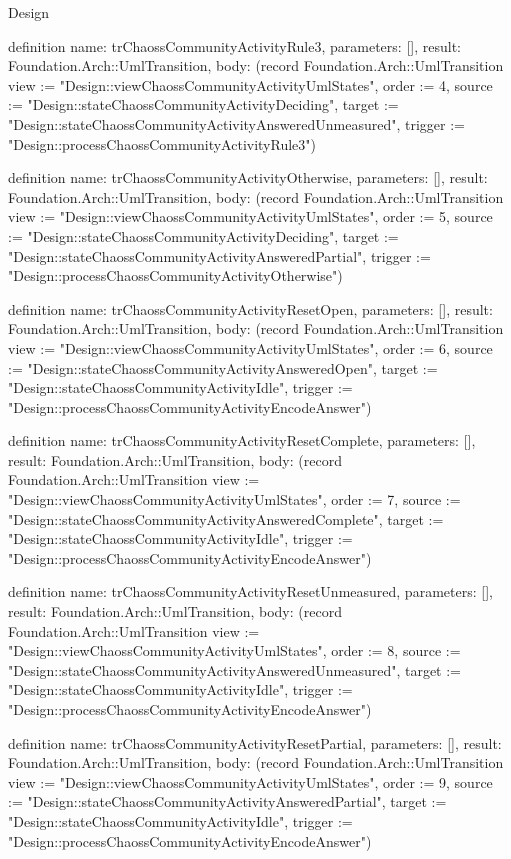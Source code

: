 \begin{lexlean}{Design}
\begin{semanticmodule}
definition{
  name: trChaossCommunityActivityRule3,
  parameters: [],
  result: Foundation.Arch::UmlTransition,
  body: (record Foundation.Arch::UmlTransition {view := "Design::viewChaossCommunityActivityUmlStates", order := 4, source := "Design::stateChaossCommunityActivityDeciding", target := "Design::stateChaossCommunityActivityAnsweredUnmeasured", trigger := "Design::processChaossCommunityActivityRule3"})
}

definition{
  name: trChaossCommunityActivityOtherwise,
  parameters: [],
  result: Foundation.Arch::UmlTransition,
  body: (record Foundation.Arch::UmlTransition {view := "Design::viewChaossCommunityActivityUmlStates", order := 5, source := "Design::stateChaossCommunityActivityDeciding", target := "Design::stateChaossCommunityActivityAnsweredPartial", trigger := "Design::processChaossCommunityActivityOtherwise"})
}

definition{
  name: trChaossCommunityActivityResetOpen,
  parameters: [],
  result: Foundation.Arch::UmlTransition,
  body: (record Foundation.Arch::UmlTransition {view := "Design::viewChaossCommunityActivityUmlStates", order := 6, source := "Design::stateChaossCommunityActivityAnsweredOpen", target := "Design::stateChaossCommunityActivityIdle", trigger := "Design::processChaossCommunityActivityEncodeAnswer"})
}

definition{
  name: trChaossCommunityActivityResetComplete,
  parameters: [],
  result: Foundation.Arch::UmlTransition,
  body: (record Foundation.Arch::UmlTransition {view := "Design::viewChaossCommunityActivityUmlStates", order := 7, source := "Design::stateChaossCommunityActivityAnsweredComplete", target := "Design::stateChaossCommunityActivityIdle", trigger := "Design::processChaossCommunityActivityEncodeAnswer"})
}

definition{
  name: trChaossCommunityActivityResetUnmeasured,
  parameters: [],
  result: Foundation.Arch::UmlTransition,
  body: (record Foundation.Arch::UmlTransition {view := "Design::viewChaossCommunityActivityUmlStates", order := 8, source := "Design::stateChaossCommunityActivityAnsweredUnmeasured", target := "Design::stateChaossCommunityActivityIdle", trigger := "Design::processChaossCommunityActivityEncodeAnswer"})
}

definition{
  name: trChaossCommunityActivityResetPartial,
  parameters: [],
  result: Foundation.Arch::UmlTransition,
  body: (record Foundation.Arch::UmlTransition {view := "Design::viewChaossCommunityActivityUmlStates", order := 9, source := "Design::stateChaossCommunityActivityAnsweredPartial", target := "Design::stateChaossCommunityActivityIdle", trigger := "Design::processChaossCommunityActivityEncodeAnswer"})
}


\end{semanticmodule}
\end{lexlean}
